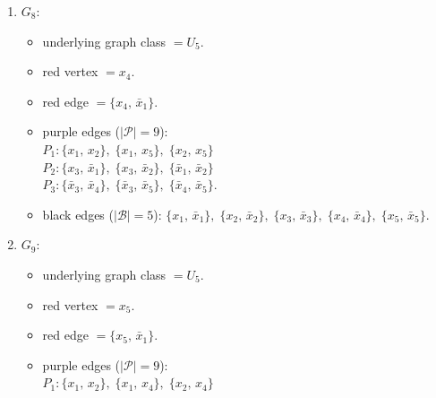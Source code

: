 \begin{enumerate}[leftmargin=*]
\begin{itemize}[leftmargin=*]
\item red vertex $= x_{1}$.
\item red edge $= \{x_{1},\,\bar{x}_{4}\}$.
\item purple edges ($|\mathcal{P}|=9$):\mbox{}\\
$P_{1}: \{x_{2},\,x_{4}\},\; \{x_{2},\,x_{5}\},\; \{x_{4},\,x_{5}\}$\\
$P_{2}: \{x_{3},\,\bar{x}_{1}\},\; \{x_{3},\,\bar{x}_{2}\},\; \{\bar{x}_{1},\,\bar{x}_{2}\}$\\
$P_{3}: \{\bar{x}_{3},\,\bar{x}_{4}\},\; \{\bar{x}_{3},\,\bar{x}_{5}\},\; \{\bar{x}_{4},\,\bar{x}_{5}\}$.
\item black edges ($|\mathcal{B}|=5$): $\{x_{1},\,\bar{x}_{1}\},\; \{x_{2},\,\bar{x}_{2}\},\; \{x_{3},\,\bar{x}_{3}\},\; \{x_{4},\,\bar{x}_{4}\},\; \{x_{5},\,\bar{x}_{5}\}$.
\end{itemize}
\item $G_{8}$:
\begin{itemize}[leftmargin=*]
\item underlying graph class $= U_5$.
\item red vertex $= x_{4}$.
\item red edge $= \{x_{4},\,\bar{x}_{1}\}$.
\item purple edges ($|\mathcal{P}|=9$):\mbox{}\\
$P_{1}: \{x_{1},\,x_{2}\},\; \{x_{1},\,x_{5}\},\; \{x_{2},\,x_{5}\}$\\
$P_{2}: \{x_{3},\,\bar{x}_{1}\},\; \{x_{3},\,\bar{x}_{2}\},\; \{\bar{x}_{1},\,\bar{x}_{2}\}$\\
$P_{3}: \{\bar{x}_{3},\,\bar{x}_{4}\},\; \{\bar{x}_{3},\,\bar{x}_{5}\},\; \{\bar{x}_{4},\,\bar{x}_{5}\}$.
\item black edges ($|\mathcal{B}|=5$): $\{x_{1},\,\bar{x}_{1}\},\; \{x_{2},\,\bar{x}_{2}\},\; \{x_{3},\,\bar{x}_{3}\},\; \{x_{4},\,\bar{x}_{4}\},\; \{x_{5},\,\bar{x}_{5}\}$.
\end{itemize}
\item $G_{9}$:
\begin{itemize}[leftmargin=*]
\item underlying graph class $= U_5$.
\item red vertex $= x_{5}$.
\item red edge $= \{x_{5},\,\bar{x}_{1}\}$.
\item purple edges ($|\mathcal{P}|=9$):\mbox{}\\
$P_{1}: \{x_{1},\,x_{2}\},\; \{x_{1},\,x_{4}\},\; \{x_{2},\,x_{4}\}$\\

\end{itemize}
\end{enumerate}

